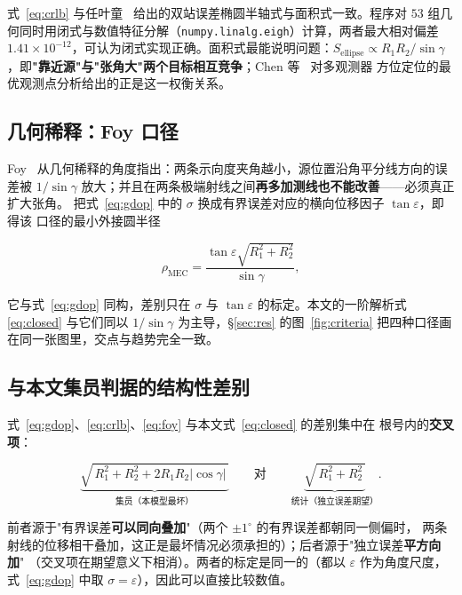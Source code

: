 式~\eqref{eq:crlb} 与任叶童~\cite{ren2016} 给出的双站误差椭圆半轴式与面积式一致。程序对
$53$ 组几何同时用闭式与数值特征分解（\texttt{numpy.linalg.eigh}）计算，两者最大相对偏差
$1.41\times10^{-12}$，可认为闭式实现正确。面积式最能说明问题：$S_{\mathrm{ellipse}}\propto
R_1R_2/\sin\gamma$，即\textbf{"靠近源"与"张角大"两个目标相互竞争}；Chen 等~\cite{chen2009} 对多观测器
方位定位的最优观测点分析给出的正是这一权衡关系。

\subsection{几何稀释：Foy 口径}

Foy~\cite{foy1976} 从几何稀释的角度指出：两条示向度夹角越小，源位置沿角平分线方向的误差被
$1/\sin\gamma$ 放大；并且在两条极端射线之间\textbf{再多加测线也不能改善}——必须真正扩大张角。
把式~\eqref{eq:gdop} 中的 $\sigma$ 换成有界误差对应的横向位移因子 $\tan\varepsilon$，即得该
口径的最小外接圆半径

\begin{equation}
  \rho_{\mathrm{MEC}}=\frac{\tan\varepsilon\sqrt{R_1^2+R_2^2}}{\sin\gamma},
  \label{eq:foy}
\end{equation}

它与式~\eqref{eq:gdop} 同构，差别只在 $\sigma$ 与 $\tan\varepsilon$ 的标定。本文的一阶解析式
\eqref{eq:closed} 与它们同以 $1/\sin\gamma$ 为主导，§\ref{sec:res} 的图~\ref{fig:criteria}
把四种口径画在同一张图里，交点与趋势完全一致。

\subsection{与本文集员判据的结构性差别}

式~\eqref{eq:gdop}、\eqref{eq:crlb}、\eqref{eq:foy} 与本文式~\eqref{eq:closed} 的差别集中在
根号内的\textbf{交叉项}：

\begin{equation}
  \underbrace{\sqrt{\,R_1^2+R_2^2+2R_1R_2|\cos\gamma|\,}}_{\text{集员（本模型最坏）}}
  \qquad\text{对}\qquad
  \underbrace{\sqrt{\,R_1^2+R_2^2\,}}_{\text{统计（独立误差期望）}}.
  \label{eq:cross}
\end{equation}

前者源于"有界误差\textbf{可以同向叠加}"（两个 $\pm1^\circ$ 的有界误差都朝同一侧偏时，
两条射线的位移相干叠加，这正是最坏情况必须承担的）；后者源于"独立误差\textbf{平方向加}"
（交叉项在期望意义下相消）。两者的标定是同一的（都以 $\varepsilon$ 作为角度尺度，
式~\eqref{eq:gdop} 中取 $\sigma=\varepsilon$），因此可以直接比较数值。

